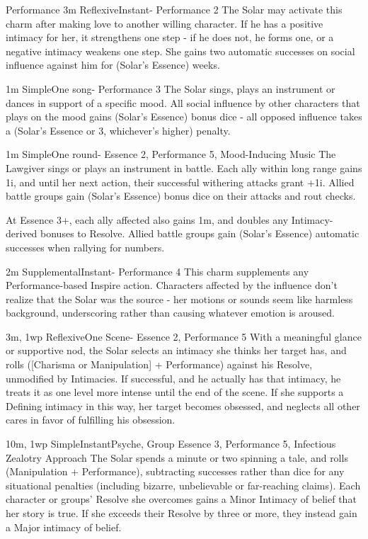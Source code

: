 \begin{Ability}{Performance}
  {3m}
  {Reflexive}{Instant}{-}
  {Performance 2}
  The Solar may activate this charm after making love to another willing character. If he has a positive intimacy for her, it strengthens one step - if he does not, he forms one, or a negative intimacy weakens one step. She gains two automatic successes on social influence against him for (Solar's Essence) weeks.

  {1m}
  {Simple}{One song}{-}
  {Performance 3}
  The Solar sings, plays an instrument or dances in support of a specific mood. All social influence by other characters that plays on the mood gains (Solar's Essence) bonus dice - all opposed influence takes a (Solar's Essence or 3, whichever's higher) penalty.

  {1m}
  {Simple}{One round}{-}
  {Essence 2, Performance 5, Mood-Inducing Music}
  The Lawgiver sings or plays an instrument in battle. Each ally within long range gains 1i, and until her next action, their successful withering attacks grant +1i. Allied battle groups gain (Solar's Essence) bonus dice on their attacks and rout checks.

  At Essence 3+, each ally affected also gains 1m, and doubles any Intimacy-derived bonuses to Resolve. Allied battle groups gain (Solar's Essence) automatic successes when rallying for numbers.

  {2m}
  {Supplemental}{Instant}{-}
  {Performance 4}
  This charm supplements any Performance-based Inspire action. Characters affected by the influence don't realize that the Solar was the source - her motions or sounds seem like harmless background, underscoring rather than causing whatever emotion is aroused.

  {3m, 1wp}
  {Reflexive}{One Scene}{-}
  {Essence 2, Performance 5}
  With a meaningful glance or supportive nod, the Solar selects an intimacy she thinks her target has, and rolls ([Charisma or Manipulation] + Performance) against his Resolve, unmodified by Intimacies. If successful, and he actually has that intimacy, he treats it as one level more intense until the end of the scene. If she supports a Defining intimacy in this way, her target becomes obsessed, and neglects all other cares in favor of fulfilling his obsession.

  {10m, 1wp}
  {Simple}{Instant}{Psyche, Group}
  {Essence 3, Performance 5, Infectious Zealotry Approach}
  The Solar spends a minute or two spinning a tale, and rolls (Manipulation + Performance), subtracting successes rather than dice for any situational penalties (including bizarre, unbelievable or far-reaching claims). Each character or groups' Resolve she overcomes gains a Minor Intimacy of belief that her story is true. If she exceeds their Resolve by three or more, they instead gain a Major intimacy of belief.


\end{Ability}
